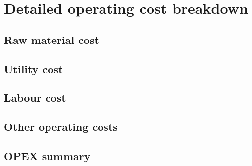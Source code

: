 \section{Detailed operating cost breakdown}
\subsection{Raw material cost}
\subsection{Utility cost}
\subsection{Labour cost}
\subsection{Other operating costs}
\subsection{OPEX summary}